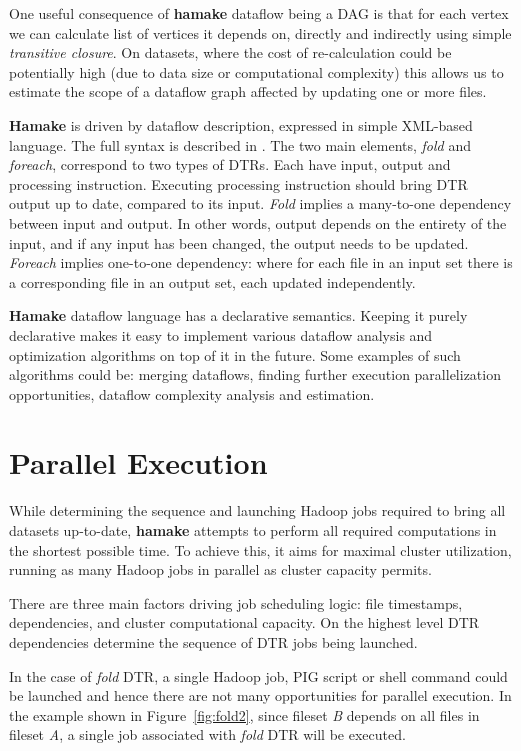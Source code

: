\documentclass[10pt,conference,letterpaper]{IEEEtran}
\begin{document}
One useful consequence of \textbf{hamake} dataflow being a DAG is
that for each vertex we can calculate list of vertices it depends on,
directly and indirectly using simple \textit{transitive closure}. On
datasets, where the cost of re-calculation could be potentially high
(due to data size or computational complexity) this allows us to estimate
the scope of a dataflow graph affected by updating one or more files.

\textbf{Hamake} is driven by dataflow description, expressed in simple
XML-based language. The full syntax is described in
\cite{hamakesyntax}. The two main elements, \emph{fold} and \emph{foreach},
 correspond to two types of DTRs. Each have input,
output and processing instruction. Executing processing instruction
should bring DTR output up to date, compared to its
input. \emph{Fold} implies a many-to-one dependency between input and
 output. In other words, output depends on the entirety of the input, and if
any input has been changed, the output needs to be
updated. \emph{Foreach} implies one-to-one dependency: where for each
file in an input set there is a corresponding file in an output set, each updated independently.

\textbf{Hamake} dataflow language has a declarative semantics. Keeping
it purely declarative makes it easy to implement various dataflow
analysis and optimization algorithms on top of it in the future. Some
examples of such algorithms could be: merging dataflows, finding
further execution parallelization opportunities, dataflow complexity
analysis and estimation.

\section{Parallel Execution}

While determining the sequence and launching Hadoop jobs required to
bring all datasets up-to-date, \textbf{hamake} attempts to perform all
required computations in the shortest possible time. To achieve this, it
aims for maximal cluster utilization, running as many Hadoop jobs in
parallel as cluster capacity permits.

There are three main factors driving job scheduling logic: file
timestamps, dependencies, and cluster computational capacity. On the
highest level DTR dependencies determine the sequence of DTR jobs being
launched.

In the case of \emph{fold} DTR, a single Hadoop job, PIG script or
shell command could be launched and hence there are not many
opportunities for parallel execution. In the example shown in
Figure~\ref{fig:fold2}, since fileset \textit{B} depends on all files
in fileset \textit{A}, a single job associated with \emph{fold} DTR
will be executed.
\end{document}
